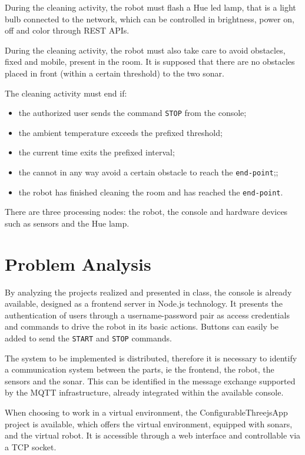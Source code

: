 During the cleaning activity, the robot must flash a Hue led lamp, that is a light bulb connected to the network, which can be controlled in brightness, power on, off and color through REST APIs.

During the cleaning activity, the robot must also take care to avoid obstacles, fixed and mobile, present in the room. It is supposed that there are no obstacles placed in front (within a certain threshold) to the two sonar.

The cleaning activity must end if:
\begin{itemize}
	\item the authorized user sends the command \texttt{STOP} from the console;
	\item the ambient temperature exceeds the prefixed threshold;
	\item the current time exits the prefixed interval;
	\item the cannot in any way avoid a certain obstacle to reach the \texttt{end-point};;
	\item the robot has finished cleaning the room and has reached the \texttt{end-point}.
\end{itemize}

There are three processing nodes: the robot, the console and hardware devices such as sensors and the Hue lamp.

\section{Problem Analysis}
By analyzing the projects realized and presented in class, the console is already available, designed as a frontend server in Node.js technology. It presents the authentication of users through a username-password pair as access credentials and commands to drive the robot in its basic actions. Buttons can easily be added to send the \texttt{START} and \texttt{STOP} commands.

The system to be implemented is distributed, therefore it is necessary to identify a communication system between the parts, ie the frontend, the robot, the sensors and the sonar. This can be identified in the message exchange supported by the MQTT infrastructure, already integrated within the available console.

When choosing to work in a virtual environment, the ConfigurableThreejsApp project is available, which offers the virtual environment, equipped with sonars, and the virtual robot. It is accessible through a web interface and controllable via a TCP socket.

